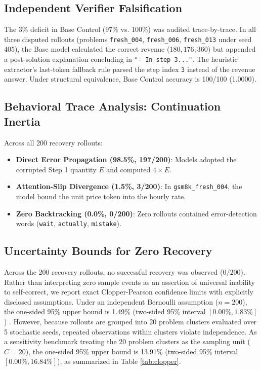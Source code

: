 \documentclass[10pt,conference]{IEEEtran}
\begin{document}
\subsection{Independent Verifier Falsification}
The 3\% deficit in Base Control (97\% vs. 100\%) was audited trace-by-trace. In all three disputed rollouts (problems \texttt{fresh\_004}, \texttt{fresh\_006}, \texttt{fresh\_013} under seed 405), the Base model calculated the correct revenue ($180, 176, 360$) but appended a post-solution explanation concluding in \texttt{"- In step 3..."}. The heuristic extractor's last-token fallback rule parsed the step index \texttt{3} instead of the revenue answer. Under structural equivalence, Base Control accuracy is 100/100 (1.0000).

\subsection{Behavioral Trace Analysis: Continuation Inertia}
Across all 200 recovery rollouts:
\begin{itemize}
    \item \textbf{Direct Error Propagation (98.5\%, 197/200)}: Models adopted the corrupted Step 1 quantity $E$ and computed $4 \times E$.
    \item \textbf{Attention-Slip Divergence (1.5\%, 3/200)}: In \texttt{gsm8k\_fresh\_004}, the model bound the unit price token into the hourly rate.
    \item \textbf{Zero Backtracking (0.0\%, 0/200)}: Zero rollouts contained error-detection words (\texttt{wait}, \texttt{actually}, \texttt{mistake}).
\end{itemize}

\subsection{Uncertainty Bounds for Zero Recovery}
Across the 200 recovery rollouts, no successful recovery was observed ($0/200$). Rather than interpreting zero sample events as an assertion of universal inability to self-correct, we report exact Clopper-Pearson confidence limits with explicitly disclosed assumptions. Under an independent Bernoulli assumption ($n=200$), the one-sided 95\% upper bound is 1.49\% (two-sided 95\% interval $[0.00\%, 1.83\%]$) \cite{clopper1934use}. However, because rollouts are grouped into 20 problem clusters evaluated over 5 stochastic seeds, repeated observations within clusters violate independence. As a sensitivity benchmark treating the 20 problem clusters as the sampling unit ($C=20$), the one-sided 95\% upper bound is 13.91\% (two-sided 95\% interval $[0.00\%, 16.84\%]$), as summarized in Table \ref{tab:clopper}.
\end{document}
